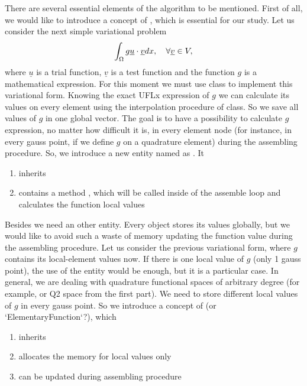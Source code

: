 \documentclass[12pt]{article}
\begin{document}
There are several essential elements of the algorithm to be mentioned. First of all, we would like to introduce a concept of , which is essential for our study. Let us consider the next simple variational problem 
$$ \int_\Omega g \underline{u} \cdot \underline{v} dx, \quad \forall \underline{v} \in V, $$
where $\underline{u}$ is a trial function, $\underline{v}$ is a test function and the function $g$ is a mathematical expression. For this moment we must use  class to implement this variational form. Knowing the exact UFLx expression of $g$ we can calculate its values on every element using the interpolation procedure of  class. So we save all values of $g$ in one global vector. The goal is to have a possibility to calculate $g$ expression, no matter how difficult it is, in every element node (for instance, in every gauss point, if we define $g$ on a quadrature element) during the assembling procedure. So, we introduce a new entity named as . It
\begin{enumerate}
    \item inherits 
    \item contains a method , which will be called inside of the assemble loop and calculates the function local values
\end{enumerate}

Besides  we need an other entity. Every  object stores its values globally, but we would like to avoid such a waste of memory updating the function value during the assembling procedure. Let us consider the previous variational form, where $g$ contains its local-element values now. If there is one local value of $g$ (only 1 gauss point), the use of the  entity would be enough, but it is a particular case. In general, we are dealing with quadrature functional spaces of arbitrary degree (for example,  or Q2 space from the first part). We need to store different local values of $g$ in every gauss point. So we introduce a concept of  (or `ElementaryFunction`?), which 
\begin{enumerate}
    \item inherits 
    \item allocates the memory for local values only
    \item can be updated during assembling procedure
\end{enumerate}
\end{document}
